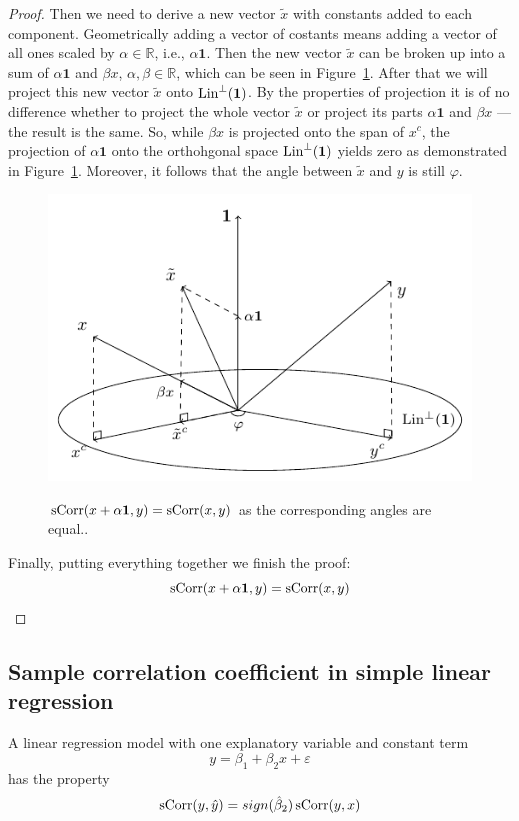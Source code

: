 \begin{proof}
Then we need to derive a new vector $\tilde x$ with constants added to each component.
Geometrically adding a vector of costants means adding a vector of all ones
scaled by $\alpha \in \mathbb{R}$, i.e., $\alpha \mathbf{1}$.
Then the new vector $\tilde x$ can be broken up into a sum of $\alpha \mathbf{1}$ and
$\beta x$, $\alpha, \beta \in \mathbb{R}$, which can be seen in Figure~\ref{fig:corr_final}.
After that we will project this new vector $\tilde x$ onto $\operatorname{Lin}^{\perp}(\mathbf{1})$.
By the properties of projection it is of no difference whether to project
the whole vector $\tilde x$ or project its parts $\alpha \mathbf{1}$
and $\beta x$ — the result is the same.
So, while $\beta x$ is projected onto the span of $x^c$, the projection of $\alpha \mathbf{1}$
onto the orthohgonal space $\operatorname{Lin}^{\perp}(\mathbf{1})$ yields zero as demonstrated
in Figure~\ref{fig:corr_final}.
Moreover, it follows that the angle between $\tilde x$ and $y$ is still $\varphi$.

\begin{figure}
\begin{center}
\includegraphics[width=0.6\linewidth]{figures/02_correlation_constant_proof.pdf}
\label{fig:corr_final}
\caption{$\operatorname{sCorr}(x + \alpha \mathbf{1}, y) = \operatorname{sCorr}(x,y)$ as the corresponding angles are equal..}
\end{center}
\end{figure}


Finally, putting everything together we finish the proof:
\[
\operatorname{sCorr}(x + \alpha \mathbf{1}, y) = \operatorname{sCorr}(x,y)
\]
\end{proof}


\subsection{Sample correlation coefficient in simple linear regression}

\begin{theorem}
A linear regression model with one explanatory variable and constant term
\[
y = \beta_1 + \beta_2 x + \varepsilon
\]
has the property
\[
\operatorname{sCorr}(y, \hat y) = sign(\hat \beta_2) \operatorname{sCorr}(y, x)
\]
\end{theorem}

